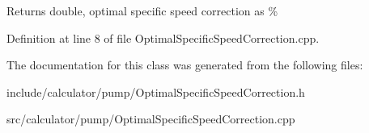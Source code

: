 \begin{DoxyReturn}{Returns}
double, optimal specific speed correction as \% 
\end{DoxyReturn}


Definition at line 8 of file Optimal\+Specific\+Speed\+Correction.\+cpp.



The documentation for this class was generated from the following files\+:\begin{DoxyCompactItemize}
\item 
include/calculator/pump/Optimal\+Specific\+Speed\+Correction.\+h\item 
src/calculator/pump/Optimal\+Specific\+Speed\+Correction.\+cpp\end{DoxyCompactItemize}
